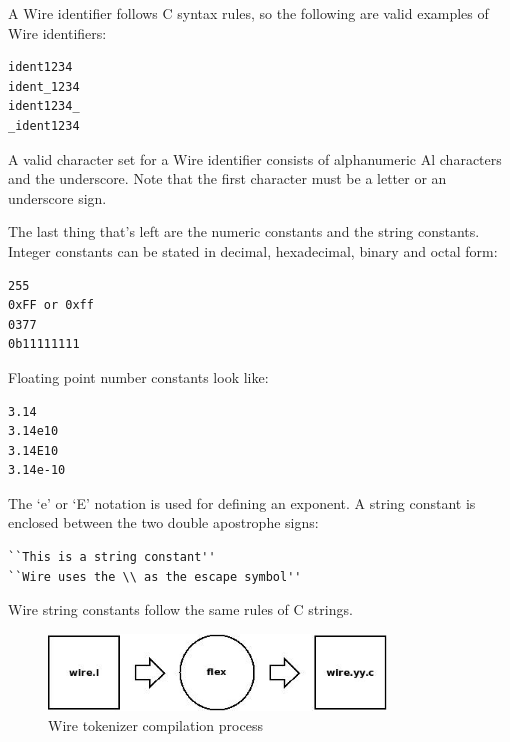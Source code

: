 \documentclass[times, utf8, diplomski]{fer}
\begin{document}
A Wire identifier follows C syntax rules, so the following are valid examples of 
Wire identifiers:
\lstset{language=IDL}
\lstset{basicstyle=\footnotesize}
\lstset{numbers=left, numberstyle=\tiny, stepnumber=1, numbersep=5pt}
\begin{lstlisting}[frame=tb]
ident1234
ident_1234
ident1234_
_ident1234
\end{lstlisting}

A valid character set for a Wire identifier consists of alphanumeric Al characters
and the underscore. Note that the first character must be a letter or an 
underscore sign.

The last thing that's left are the numeric constants and the string constants. 
Integer constants can be stated in decimal, hexadecimal, binary and octal form:
\lstset{language=IDL}
\lstset{basicstyle=\footnotesize}
\lstset{numbers=left, numberstyle=\tiny, stepnumber=1, numbersep=5pt}
\begin{lstlisting}[frame=tb]
255
0xFF or 0xff
0377
0b11111111
\end{lstlisting}

Floating point number constants look like:
\lstset{language=IDL}
\lstset{basicstyle=\footnotesize}
\lstset{numbers=left, numberstyle=\tiny, stepnumber=1, numbersep=5pt}
\begin{lstlisting}[frame=tb]
3.14
3.14e10
3.14E10
3.14e-10
\end{lstlisting}

The `e' or `E' notation is used for defining an exponent.
A string constant is enclosed between the two double apostrophe signs:
\lstset{language=IDL}
\lstset{basicstyle=\footnotesize}
\lstset{numbers=left, numberstyle=\tiny, stepnumber=1, numbersep=5pt}
\begin{lstlisting}[frame=tb]
``This is a string constant''
``Wire uses the \\ as the escape symbol''
\end{lstlisting}
Wire string constants follow the same rules of C strings.

\begin{figure}[htb]
\begin{center}
\leavevmode
\includegraphics[width=0.8\textwidth]{flex}
\end{center}
\caption{Wire tokenizer compilation process}
\label{fig:wire_tknzr_flex}
\end{figure}
\end{document}
